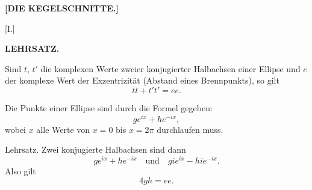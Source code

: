 \clearpage{}

\begin{center}
\textbf{[DIE KEGELSCHNITTE.]}
\end{center}

\begin{center}
[I.]

\textbf{LEHRSATZ.}
\end{center}

Sind $t$, $t'$ die komplexen Werte zweier konjugierter Halbachsen einer
Ellipse und $e$ der komplexe Wert der Exzentrizität (Abstand eines
Brennpunkts), so gilt
\[
tt + t't' = ee.
\]

Die Punkte einer Ellipse sind durch die Formel gegeben:
\[
g e^{ix} + h e^{-ix},
\]
wobei $x$ alle Werte von $x = 0$ bis $x = 2\pi$ durchlaufen muss.

Lehrsatz. Zwei konjugierte Halbachsen sind dann
\[
g e^{ix} + h e^{-ix} \quad \text{und} \quad g i e^{ix} - h i e^{-ix}.
\]
Also gilt
\[
4gh = ee.
\]
